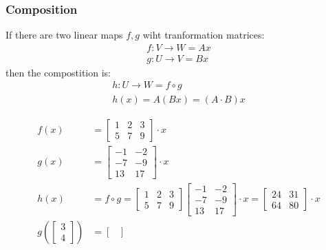 \subsubsection{Composition}
If there are two linear maps \(f, g\) wiht tranformation matrices:
\begin{align*}
    f : V \rightarrow W  = Ax \\
    g : U \rightarrow V = Bx
\end{align*}
then the compostition is:
\begin{align*}
    h : U \rightarrow W = f \circ g \\
    h(x) = A(Bx) = (A \cdot B)x
\end{align*}
\begin{example}
    \begin{align*}
        f(x)                                        & = \begin{bmatrix}
            1 & 2 & 3 \\ 5 & 7 & 9
        \end{bmatrix} \cdot x                                                                             \\
        g(x)                                        & = \begin{bmatrix}
            -1 & -2 \\ -7 & -9 \\ 13 & 17
        \end{bmatrix} \cdot x                                                                             \\
        h(x)                                        & = f \circ g = \begin{bmatrix}
            1 & 2 & 3 \\ 5 & 7 & 9
        \end{bmatrix} \begin{bmatrix}
            -1 & -2 \\ -7 & -9 \\ 13 & 17
        \end{bmatrix} \cdot x = \begin{bmatrix}
            24 & 31 \\ 64  & 80
        \end{bmatrix} \cdot x \\
        g \left( \begin{bmatrix}
            3 \\ 4
        \end{bmatrix} \right) & = \begin{bmatrix}

\end{bmatrix}
\end{align*}
\end{example}

